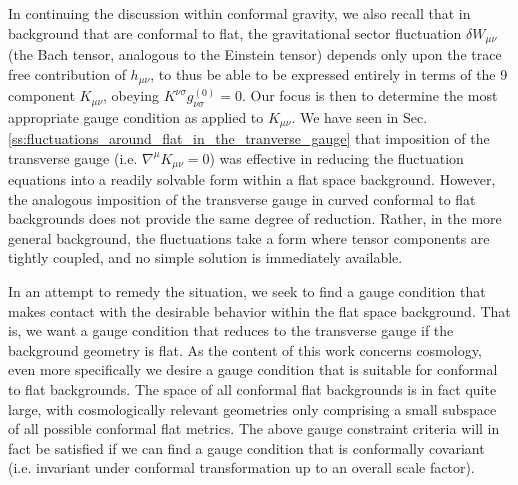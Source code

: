 In continuing the discussion within conformal gravity, we also recall that in background that are conformal to flat, the gravitational sector fluctuation $\delta W_{\mu\nu}$ (the Bach tensor, analogous to the Einstein tensor) depends only upon the trace free contribution of $h_{\mu\nu}$, to thus be able to be expressed entirely in terms of the 9 component $K_{\mu\nu}$, obeying $K^{\nu\sigma}g^{(0)}_{\nu\sigma}=0$. Our focus is then to determine the most appropriate gauge condition as applied to $K_{\mu\nu}$. We have seen in Sec. \ref{ss:fluctuations_around_flat_in_the_tranverse_gauge} that imposition of the transverse gauge (i.e. $\nabla^\mu K_{\mu\nu} = 0$) was effective in reducing the fluctuation equations into a readily solvable form within a flat space background. However, the analogous imposition of the transverse gauge in curved conformal to flat backgrounds does not provide the same degree of reduction. Rather, in the more general background, the fluctuations take a form where tensor components are tightly coupled, and no simple solution is immediately available. 

In an attempt to remedy the situation, we seek to find a gauge condition that makes contact with the desirable behavior within the flat space background. That is, we want a gauge condition that reduces to the transverse gauge if the background geometry is flat. As the content of this work concerns cosmology, even more specifically we desire a gauge condition that is suitable for conformal to flat backgrounds. The space of all conformal flat backgrounds is in fact quite large, with cosmologically relevant geometries only comprising a small subspace of all possible conformal flat metrics. The above gauge constraint criteria will in fact be satisfied if we can find a gauge condition that is conformally covariant (i.e. invariant under conformal transformation up to an overall scale factor). 

